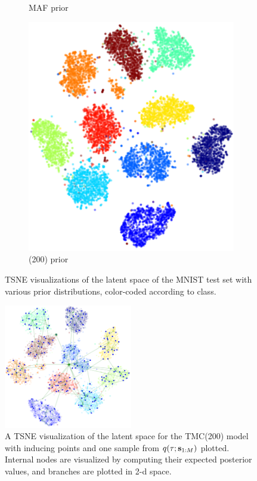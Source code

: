 \begin{figure}[h]
\begin{subfigure}[t]{0.3\textwidth}
    \caption{MAF prior}
\end{subfigure}
\begin{subfigure}[t]{0.3\textwidth}
    \centering
    \includegraphics[width=\textwidth]{img/loracs/mnist/tsne/mnist2-tsne-tmc.png}
    \caption{\acronym(200) prior}
\end{subfigure}
\caption{TSNE visualizations of the latent space of the MNIST test set with various prior distributions, color-coded according to class.}
\label{fig:tsne}
\end{figure}

\begin{figure}[h]
    \centering
    \includegraphics[width=0.5\textwidth]{img/loracs/mnist/tsne/mnist2-tsne-tmc-tree.png}
    \caption{A TSNE visualization of the latent space for the TMC(200) model with inducing points and one sample from $q(\tau; \mathbf{s}_{1:M})$ plotted. Internal nodes are visualized by computing their expected posterior values, and branches are plotted in 2-d space.}
    \label{fig:mnist-tsne-tree}
\end{figure}



